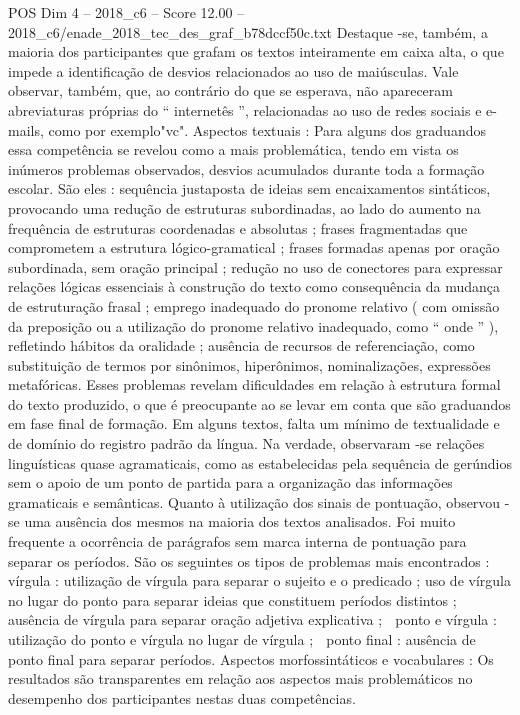 \begin{textsample}{POS Dim 4 – 2018\_c6 – Score 12.00 – 2018\_c6/enade\_2018\_tec\_des\_graf\_b78dccf50c.txt}
Destaque -se, também, a maioria dos participantes que grafam os textos inteiramente em caixa alta, o que impede a identificação de desvios relacionados ao uso de maiúsculas.
Vale observar, também, que, ao contrário do que se esperava, não apareceram abreviaturas próprias do “ internetês ”, relacionadas ao uso de redes sociais e e-mails, como por exemplo"vc".
Aspectos textuais : Para alguns dos graduandos essa competência se revelou como a mais problemática, tendo em vista os inúmeros problemas observados, desvios acumulados durante toda a formação escolar.
São eles : sequência justaposta de ideias sem encaixamentos sintáticos, provocando uma redução de estruturas subordinadas, ao lado do aumento na frequência de estruturas coordenadas e absolutas ; frases fragmentadas que comprometem a estrutura lógico-gramatical ; frases formadas apenas por oração subordinada, sem oração principal ; redução no uso de conectores para expressar relações lógicas essenciais à construção do texto como consequência da mudança de estruturação frasal ; emprego inadequado do pronome relativo ( com omissão da preposição ou a utilização do pronome relativo inadequado, como “ onde ” ), refletindo hábitos da oralidade ; ausência de recursos de referenciação, como substituição de termos por sinônimos, hiperônimos, nominalizações, expressões metafóricas.
Esses problemas revelam dificuldades em relação à estrutura formal do texto produzido, o que é preocupante ao se levar em conta que são graduandos em fase final de formação.
Em alguns textos, falta um mínimo de textualidade e de domínio do registro padrão da língua.
Na verdade, observaram -se relações linguísticas quase agramaticais, como as estabelecidas pela sequência de gerúndios sem o apoio de um ponto de partida para a organização das informações gramaticais e semânticas.
Quanto à utilização dos sinais de pontuação, observou -se uma ausência dos mesmos na maioria dos textos analisados.
Foi muito frequente a ocorrência de parágrafos sem marca interna de pontuação para separar os períodos.
São os seguintes os tipos de problemas mais encontrados :  vírgula : utilização de vírgula para separar o sujeito e o predicado ; uso de vírgula no lugar do ponto para separar ideias que constituem períodos distintos ; ausência de vírgula para separar oração adjetiva explicativa ;  ponto e vírgula : utilização do ponto e vírgula no lugar de vírgula ;  ponto final : ausência de ponto final para separar períodos.
Aspectos morfossintáticos e vocabulares : Os resultados são transparentes em relação aos aspectos mais problemáticos no desempenho dos participantes nestas duas competências.

\end{textsample}
